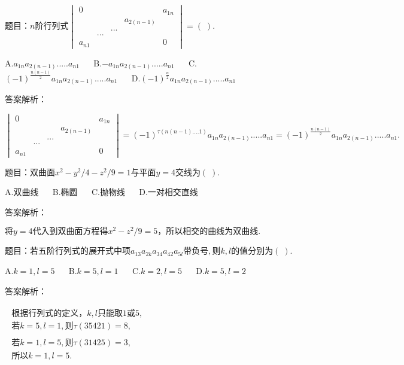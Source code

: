 题目：$n\mathrm{阶行列式}\begin{vmatrix}0&&&&a_{1n}\\&&&a_{2(n-1)}&\\&&...&&\\&...&&&\\a_{n1}&&&&0\end{vmatrix}=(\;).$

A.$a_{1n}a_{2(n-1)}.....a_{n1}$ $\quad$ B.$-a_{1n}a_{2(n-1)}.....a_{n1}$ $\quad$ C.$(-1)^{\textstyle\frac{n(n-1)}2}a_{1n}a_{2(n-1)}.....a_{n1}$ $\quad$ D.$(-1)^{\textstyle\frac n2}a_{1n}a_{2(n-1)}.....a_{n1}$

答案解析：

$\begin{vmatrix}0&&&&a_{1n}\\&&&a_{2(n-1)}&\\&&...&&\\&...&&&\\a_{n1}&&&&0\end{vmatrix}=(-1)^{\tau(n(n-1)....1)}a_{1n}a_{2(n-1)}.....a_{n1}=(-1)^{\textstyle\frac{n(n-1)}2}a_{1n}a_{2(n-1)}.....a_{n1}.$



题目：$\mathrm{双曲面}x^2-y^2/4-z^2/9=1\mathrm{与平面}y=4\mathrm{交线为}(\;).$

A.$\mathrm{双曲线}$ $\quad$ B.$\mathrm{椭圆}$ $\quad$ C.$\mathrm{抛物线}$ $\quad$ D.$\mathrm{一对相交直线}$

答案解析：

$将y=4\mathrm{代入到双曲面方程得}x^2-z^2/9=5，\mathrm{所以相交的曲线为双曲线}.$



题目：$\mathrm{若五阶行列式的展开式中项}a_{13}a_{2k}a_{34}a_{42}a_{5l}\mathrm{带负号},\mathrm 则k,l\mathrm{的值分别为}(\;).$

A.$k=1,l=5$ $\quad$ B.$k=5,l=1$ $\quad$ C.$k=2,l=5$ $\quad$ D.$k=5,l=2$

答案解析：

$\begin{array}{l}\begin{array}{l}\mathrm{根据行列式的定义}，k,l\mathrm{只能取}1或5,\\若k=5,l=1,则\tau(35421)=8,\end{array}\\\begin{array}{l}若k=1,l=5,则\tau(31425)=3,\\\mathrm{所以}k=1,l=5.\\\end{array}\end{array}$



